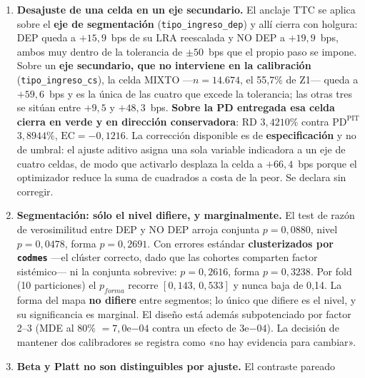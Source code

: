 \documentclass[12pt, a4paper]{article}
\newcommand{\PDPIT}{\ensuremath{\mathrm{PD}^{\mathrm{PIT}}}}
\newcommand{\RD}{\ensuremath{\mathrm{RD}}}
\newcommand{\LRA}{\ensuremath{\mathrm{LRA}}}
\newcommand{\EC}{\ensuremath{\mathrm{EC}}}
\begin{document}
\begin{enumerate}[nosep]
    \textbf{duplica ($2{,}11\times$) en cinco meses con datos macro ya observados}.
    \textbf{Ante un deterioro peor que el de 2022--2023 la $\PDPIT$ deja de acompañar la mora.} No
    es error de cálculo sino limitación de \textbf{alcance y supuestos} (anti-extrapolación
    in-sample sobre un solo ciclo). Se gobierna con análisis de escenarios y recalibración al
    ampliarse la ventana, no con mayor amplitud del factor; y la $\PDPIT$ de Z2 (2,9009\%) debe
    leerse como nivel de régimen benigno \textbf{con fecha de vencimiento}.
    \item \textbf{Desajuste de una celda en un eje secundario.} El anclaje TTC se aplica sobre el \textbf{eje de segmentación} (\texttt{tipo\_ingreso\_dep}) y allí cierra con holgura: DEP queda a $+15{,}9$~bps de su \LRA{} reescalada y NO DEP a $+19{,}9$~bps, ambos muy dentro de la tolerancia de $\pm50$~bps que el propio paso se impone. Sobre un \textbf{eje secundario, que no interviene en la calibración} (\texttt{tipo\_ingreso\_cs}), la celda MIXTO ---$n=14.674$, el 55,7\% de Z1--- queda a $+59{,}6$~bps y es la única de las cuatro que excede la tolerancia; las otras tres se sitúan entre $+9{,}5$ y $+48{,}3$~bps. \textbf{Sobre la PD entregada esa celda cierra en verde y en dirección conservadora}: \RD{} $3{,}4210\%$ contra $\PDPIT$ $3{,}8944\%$, $\EC=-0{,}1216$. La corrección disponible es de \textbf{especificación} y no de umbral: el ajuste aditivo asigna una sola variable indicadora a un eje de cuatro celdas, de modo que activarlo desplaza la celda a $+66{,}4$~bps porque el optimizador reduce la suma de cuadrados a costa de la peor. Se declara sin corregir.
\item \textbf{Segmentación: sólo el nivel difiere, y marginalmente.} El test de razón de
    verosimilitud entre DEP y NO DEP arroja conjunta $p=0{,}0880$, nivel $p=0{,}0478$, forma
    $p=0{,}2691$. Con errores estándar \textbf{clusterizados por \texttt{codmes}} ---el clúster
    correcto, dado que las cohortes comparten factor sistémico--- ni la conjunta sobrevive:
    $p=0{,}2616$, forma $p=0{,}3238$. Por fold (10 particiones) el $p_{forma}$ recorre $[0{,}143,\,0{,}533]$
    y nunca baja de 0,14. La forma del mapa \textbf{no difiere} entre segmentos; lo único que
    difiere es el nivel, y su significancia es marginal. El diseño está además subpotenciado por
    factor 2--3 (MDE al 80\% $=7{,}0$e$-04$ contra un efecto de $3$e$-04$). La decisión de mantener
    dos calibradores se registra como «no hay evidencia para cambiar».
  \item \textbf{Beta y Platt no son distinguibles por ajuste.} El contraste pareado

\end{enumerate}
\end{document}

